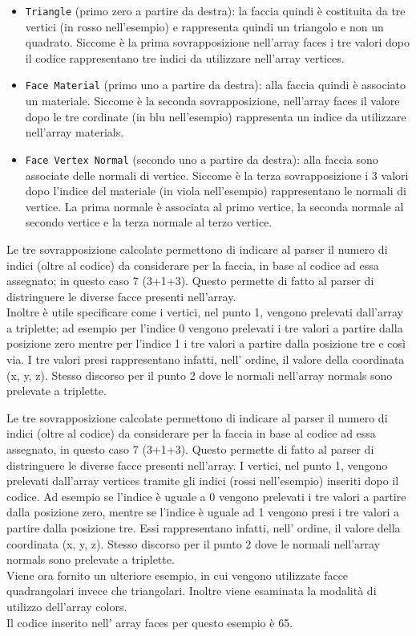 \begin{itemize}
\item \texttt{Triangle} (primo zero a partire da destra): la faccia quindi è costituita da tre vertici (in rosso nell'esempio) e rappresenta quindi un triangolo e non un quadrato. Siccome è la prima sovrapposizione nell’array faces i tre valori dopo il codice rappresentano tre indici da utilizzare nell’array vertices.
\item \texttt{Face Material} (primo uno a partire da destra): alla faccia quindi è associato un materiale. Siccome è la seconda sovrapposizione, nell’array faces il valore dopo le tre cordinate (in blu nell'esempio) rappresenta un indice da utilizzare nell’array materials.
\item \texttt{Face Vertex Normal} (secondo uno a partire da destra): alla faccia sono associate delle normali di vertice. Siccome è la terza sovrapposizione i 3 valori dopo l’indice del materiale (in viola nell'esempio) rappresentano le normali di vertice. La prima normale è associata al primo vertice, la seconda normale al secondo vertice e la terza normale al terzo vertice.
\end{itemize}

Le tre sovrapposizione calcolate permettono di indicare al parser il numero di indici (oltre al codice) da considerare per la faccia, in base al codice ad essa assegnato; in questo caso 7 (3+1+3). 
Questo permette di fatto al parser di distringuere le diverse facce presenti nell’array.
\\
Inoltre è utile specificare come  i vertici, nel punto 1, vengono prelevati dall’array a triplette; ad esempio per l’indice 0 vengono prelevati i tre valori a partire dalla posizione zero mentre per l’indice 1 i tre valori a partire dalla posizione tre e così via. I tre valori presi rappresentano infatti, nell’ ordine, il valore della coordinata (x, y, z).
Stesso discorso per il punto 2 dove le normali nell’array normals sono prelevate a triplette.

Le tre sovrapposizione calcolate permettono di indicare al parser il numero di indici (oltre al codice) da considerare per la faccia in base al codice ad essa assegnato, in questo caso 7 (3+1+3). 
Questo permette di fatto al parser di distringuere le diverse facce presenti nell’array.
I vertici, nel punto 1, vengono prelevati dall’array vertices tramite gli indici (rossi nell’esempio) inseriti dopo il codice. Ad esempio se l’indice è uguale a 0 vengono prelevati i tre valori a partire dalla posizione zero, mentre se l’indice è uguale ad 1 vengono presi i tre valori a partire dalla posizione tre. Essi rappresentano infatti, nell’ ordine, il valore della coordinata (x, y, z).
Stesso discorso per il punto 2 dove le normali nell’array normals sono prelevate a triplette.
\\
Viene ora fornito un ulteriore esempio, in cui vengono utilizzate facce quadrangolari invece che triangolari. Inoltre viene esaminata la modalità di utilizzo dell’array colors.
\\
Il codice inserito nell' array faces per questo esempio è 65.

